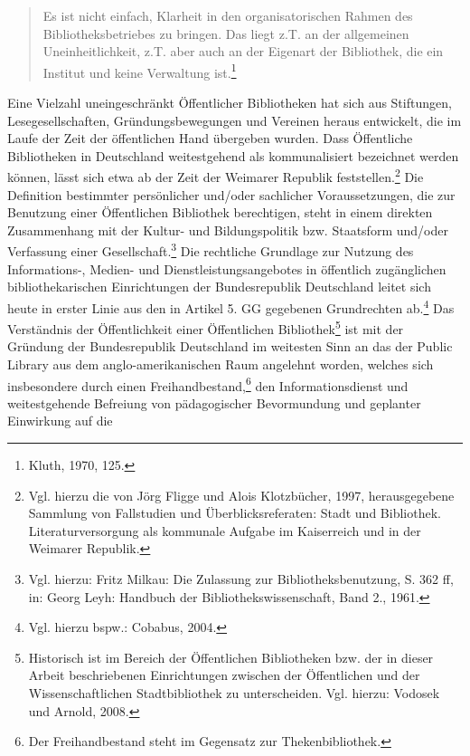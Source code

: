 \documentclass[a4paper,
fontsize=11pt,
oneside,
numbers=noperiodatend,
parskip=half-,
bibliography=totoc,
final
]{scrartcl}
\begin{document}
\begin{quote}
Es ist nicht einfach, Klarheit in den organisatorischen Rahmen des
Bibliotheksbetriebes zu bringen. Das liegt z.T. an der allgemeinen
Uneinheitlichkeit, z.T. aber auch an der Eigenart der Bibliothek, die
ein Institut und keine Verwaltung ist.\footnote{Kluth, 1970, 125.}
\end{quote}

Eine Vielzahl uneingeschränkt Öffentlicher Bibliotheken hat sich aus
Stiftungen, Lesegesellschaften, Gründungsbewegungen und Vereinen heraus
entwickelt, die im Laufe der Zeit der öffentlichen Hand übergeben
wurden. Dass Öffentliche Bibliotheken in Deutschland weitestgehend als
kommunalisiert bezeichnet werden können, lässt sich etwa ab der Zeit der
Weimarer Republik feststellen.\footnote{Vgl. hierzu die von Jörg Fligge
  und Alois Klotzbücher, 1997, herausgegebene Sammlung von Fallstudien
  und Überblicksreferaten: Stadt und Bibliothek. Literaturversorgung als
  kommunale Aufgabe im Kaiserreich und in der Weimarer Republik.} Die
Definition bestimmter persönlicher und/oder sachlicher Voraussetzungen,
die zur Benutzung einer Öffentlichen Bibliothek berechtigen, steht in
einem direkten Zusammenhang mit der Kultur- und Bildungspolitik bzw.
Staatsform und/oder Verfassung einer Gesellschaft.\footnote{Vgl. hierzu:
  Fritz Milkau: Die Zulassung zur Bibliotheksbenutzung, S. 362 ff, in:
  Georg Leyh: Handbuch der Bibliothekswissenschaft, Band 2., 1961.} Die
rechtliche Grundlage zur Nutzung des Informations-, Medien- und
Dienstleistungsangebotes in öffentlich zugänglichen bibliothekarischen
Einrichtungen der Bundesrepublik Deutschland leitet sich heute in erster
Linie aus den in Artikel 5. GG gegebenen Grundrechten ab.\footnote{Vgl.
  hierzu bspw.: Cobabus, 2004.} Das Verständnis der Öffentlichkeit einer
Öffentlichen Bibliothek\footnote{Historisch ist im Bereich der
  Öffentlichen Bibliotheken bzw. der in dieser Arbeit beschriebenen
  Einrichtungen zwischen der Öffentlichen und der Wissenschaftlichen
  Stadtbibliothek zu unterscheiden. Vgl. hierzu: Vodosek und Arnold,
  2008.} ist mit der Gründung der Bundesrepublik Deutschland im
weitesten Sinn an das der Public Library aus dem anglo-amerikanischen
Raum angelehnt worden, welches sich insbesondere durch einen
Freihandbestand,\footnote{Der Freihandbestand steht im Gegensatz zur
  Thekenbibliothek.} den Informationsdienst und weitestgehende Befreiung
von pädagogischer Bevormundung und geplanter Einwirkung auf die
\end{document}
